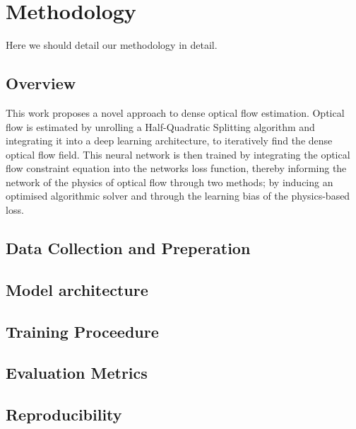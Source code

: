 \section{Methodology} \label{sec:method}
\color{red}
Here we should detail our methodology in detail.
\color{gray}

\subsection*{Overview}

\IEEEPARstart{}{} This work proposes a novel approach to dense optical flow estimation. Optical flow is estimated by unrolling a Half-Quadratic Splitting algorithm and integrating it into a deep learning architecture, to iteratively find the dense optical flow field. This neural network is then trained by integrating the optical flow constraint equation into the networks loss function, thereby informing the network of the physics of optical flow through two methods; by inducing an optimised algorithmic solver and through the learning bias of the physics-based loss.

\subsection*{Data Collection and Preperation}

\IEEEPARstart{}{} 

\subsection*{Model architecture}

\IEEEPARstart{}{} 

\subsection*{Training Proceedure}

\IEEEPARstart{}{} 

\subsection*{Evaluation Metrics}

\IEEEPARstart{}{} 

\subsection*{Reproducibility}

\IEEEPARstart{}{} 

